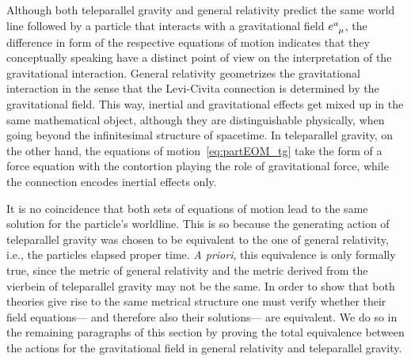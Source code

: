 \documentclass[
final,
11pt,
a4paper,
DIV=11,
headinclude=true,
footinclude=false,
bibliography=totoc,
twoside=true,  %
BCOR=5mm
]{scrbook}
\begin{document}
Although both teleparallel gravity and general relativity predict 
the same world line followed by a particle that interacts with 
a gravitational field $e\ind{^a_\mu}$, the difference in form of 
the respective equations of motion indicates that they 
conceptually speaking have a distinct point of view on the 
interpretation of the gravitational interaction. General 
relativity geometrizes the gravitational interaction in the sense 
that the Levi-Civita connection is determined by the 
gravitational field. This way, inertial and gravitational effects 
get mixed up in the same mathematical object, although they are 
distinguishable physically, when going beyond the infinitesimal 
structure of spacetime. In teleparallel gravity, on the other 
hand, the equations of motion~\eqref{eq:partEOM_tg} take the form 
of a force equation with the contortion playing the role of 
gravitational force, while the connection encodes inertial 
effects only.

It is no coincidence that both sets of equations of motion lead 
to the same solution for the particle's worldline. This is so 
because the generating action of teleparallel gravity was chosen 
to be equivalent to the one of general relativity, i.e., the 
particles elapsed proper time. \emph{A priori}, this equivalence 
is only formally true, since the metric of general relativity and 
the metric derived from the vierbein of teleparallel gravity may 
not be the same. In order to show that both theories give rise to 
the same metrical structure one must verify whether their field 
equations--- and therefore also their solutions--- are 
equivalent.  We do so in the remaining paragraphs of this section 
by proving the total equivalence between the actions for the 
gravitational field in general relativity and teleparallel 
gravity. 
\end{document}
